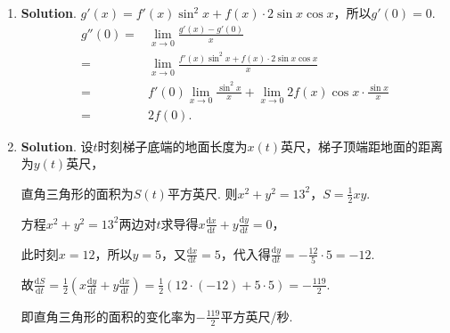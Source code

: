 \documentclass[../Main.tex]{subfiles}
\begin{document}
\begin{enumerate}
    \item \textbf{Solution}. $g'(x)=f'(x)\sin^{2} x+f(x)\cdot 2\sin x\cos x$，所以$g
              '(0)=0$.
          \[
              \begin{aligned}
                  g''(0) = & \lim_{x\to0}\frac{g'(x)-g'(0)}{x}                                                 \\
                  =        & \lim_{x\to0}\frac{f'(x)\sin^2 x+f(x)\cdot 2\sin x\cos x}{x}                       \\
                  =        & f'(0)\lim_{x\to0}\frac{\sin^2 x}{x}+\lim_{x\to 0}2f(x)\cos x\cdot\frac{\sin x}{x} \\
                  =        & 2f(0).
              \end{aligned}
          \]

    \item \textbf{Solution}. 设$t$时刻梯子底端的地面长度为$x(t)$英尺，梯子顶端距地面的距离为$y
              (t)$英尺，

          直角三角形的面积为$S(t)$平方英尺. 则$x^{2}+y^{2}=13^{2}$，$S=\frac{1}{2}xy$.

          方程$x^{2}+y^{2}=13^{2}$两边对$t$求导得$x\frac{\mathrm{d}x}{\mathrm{d}t}+y\frac{\mathrm{d}y}{\mathrm{d}t}
              =0$，

          此时刻$x=12$，所以$y=5$，又$\frac{\mathrm{d}x}{\mathrm{d}t}=5$，代入得$\frac{\mathrm{d}y}{\mathrm{d}t}
              =-\frac{12}{5}\cdot 5=-12$.

          故$\frac{\mathrm{d}S}{\mathrm{d}t}=\frac{1}{2}\left(x\frac{\mathrm{d}y}{\mathrm{d}t}
              +y\frac{\mathrm{d}x}{\mathrm{d}t}\right)=\frac{1}{2}(12\cdot(-12)+5\cdot 5)
              =-\frac{119}{2}$.

          即直角三角形的面积的变化率为$-\frac{119}{2}$平方英尺/秒.
\end{enumerate}
\end{document}
